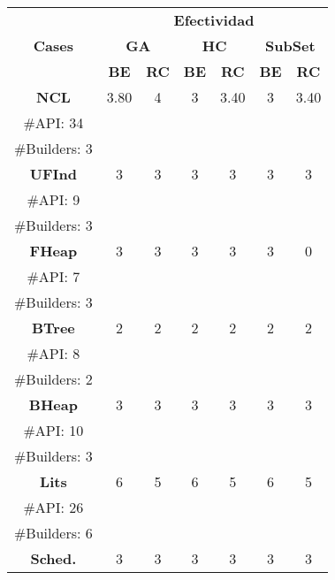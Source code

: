 \begin{table}[H]
\centering
\label{tab:t1}
\scriptsize
\begin{tabular}{|c c|cc|cc|cc|}
\midrule
\multicolumn{2}{|c|}{\multirow{3}{*}{\textbf{Cases}}} & \multicolumn{6}{c|}{\textbf{Efectividad}} \\
\cline{3-8}
\multicolumn{2}{|c|}{} & \multicolumn{2}{c}{\textbf{GA}} & \multicolumn{2}{c}{\textbf{HC}} & \multicolumn{2}{c|}{\textbf{SubSet}} \\
\multicolumn{2}{|c|}{} & \textbf{\tiny{BE}} & \textbf{\tiny{RC}} & \textbf{\tiny{BE}} & \textbf{\tiny{RC}} & \textbf{\tiny{BE}} & \textbf{\tiny{RC}} \\
\midrule
\multicolumn{2}{|c|}{\textbf{NCL}} & 3.80  &  4 & 3 &  3.40 &3 &  3.40 \\
\multicolumn{2}{|c|}{\tiny \#API: 34} &  &   & &   & & \\
\multicolumn{2}{|c|}{\tiny \#Builders: 3} &  &   & &   & & \\

\midrule
\multicolumn{2}{|c|}{\textbf{UFInd}}& 3 & 3  & 3  & 3  &3   & 3     \\
\multicolumn{2}{|c|}{\tiny \#API: 9} &  &   & &   & & \\
\multicolumn{2}{|c|}{\tiny \#Builders: 3} &  &   & &   & & \\
\midrule

\multicolumn{2}{|c|}{\textbf{FHeap}}& 3 & 3  &  3 &  3 &  3 &  0   \\
\multicolumn{2}{|c|}{\tiny \#API: 7} &  &   & &   & & \\
\multicolumn{2}{|c|}{\tiny \#Builders: 3} &  &   & &   & & \\
\midrule
\multicolumn{2}{|c|}{\textbf{BTree}} & 2 & 2  &  2 &  2 &  2 &  2  \\
\multicolumn{2}{|c|}{\tiny \#API: 8} &  &   & &   & & \\
\multicolumn{2}{|c|}{\tiny \#Builders: 2} &  &   & &   & & \\
\midrule
\multicolumn{2}{|c|}{\textbf{BHeap}}& 3 & 3 &  3 &  3 &  3 &  3   \\
\multicolumn{2}{|c|}{\tiny \#API: 10} &  &   & &   & & \\
\multicolumn{2}{|c|}{\tiny \#Builders: 3} &  &   & &   & & \\
\midrule
\multicolumn{2}{|c|}{\textbf{Lits}} &  6 & 5 & 6 &  5  & 6  &5   \\
\multicolumn{2}{|c|}{\tiny \#API: 26} &  &   & &   & & \\
\multicolumn{2}{|c|}{\tiny \#Builders: 6} &  &   & &   & & \\
\midrule
\multicolumn{2}{|c|}{\textbf{Sched.}} &  3 & 3   & 3  &  3&  3 & 3 \\


\end{tabular}
\end{table}
